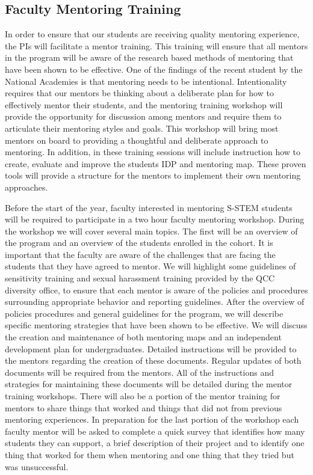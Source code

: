 \documentclass[12pt]{article}
\begin{document}
\subsection{Faculty Mentoring Training}\label{sect:facultytraining}

In order to ensure that our students are receiving quality mentoring experience, the PIs will facilitate a mentor training.  This training will ensure that all mentors in the program will be aware of the research based methods of mentoring that have been shown to be effective.  One of the findings of the recent student by the National Academies is that mentoring needs to be intentional.  Intentionality requires that our mentors be thinking about a deliberate plan for how to effectively mentor their students, and the mentoring training workshop will provide the opportunity for discussion among mentors and require them to articulate their mentoring styles and goals. This workshop will bring most mentors on board to providing a thoughtful and deliberate approach to mentoring.  In addition, in these training sessions will include instruction how to create, evaluate and improve the students IDP and mentoring map. These proven tools will provide a structure for the mentors to implement their own mentoring approaches.  

Before the start of the year, faculty interested in mentoring S-STEM students will be required to participate in a two hour faculty mentoring workshop.  During the workshop we will cover several main topics.  The first will be an overview of the program and an overview of the students enrolled in the cohort.  It is important that the faculty are aware of the challenges that are facing the students that they have agreed to mentor.  We will highlight some guidelines of sensitivity training and sexual harassment training provided by the  QCC diversity office, to ensure that each mentor is aware of the policies and procedures surrounding appropriate behavior and reporting guidelines.  After the overview of policies procedures and general guidelines for the program, we will describe specific mentoring strategies that have been shown to be effective. We will discuss the creation and maintenance of both mentoring maps and an independent development plan for undergraduates.  Detailed instructions will be provided to the mentors regarding the creation of these documents.  Regular updates of both documents will be required from the mentors.  All of the instructions and strategies for maintaining these documents will be detailed during the mentor training workshops.   There will also be a portion of the mentor training for mentors to share things that worked and things that did not from previous mentoring experiences.  In preparation for the last portion of the workshop each faculty mentor will be asked to complete a quick survey that identifies how many students they can support, a brief description of their project and to identify one thing that worked for them when mentoring and one thing that they tried but was unsuccessful. 
\end{document}
